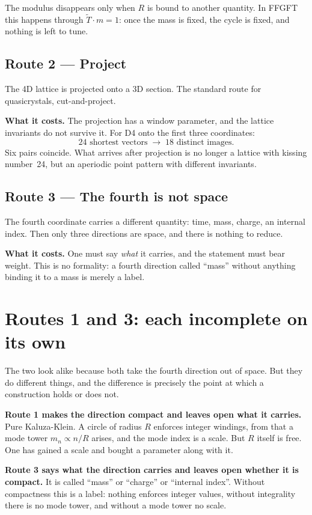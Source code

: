 The modulus disappears only when $R$ is bound to another quantity. In
FFGFT this happens through $\tilde T \cdot m = 1$: once the mass is
fixed, the cycle is fixed, and nothing is left to tune.

\section{Route 2 --- Project}

The 4D lattice is projected onto a 3D section. The standard route for
quasicrystals, cut-and-project.

\textbf{What it costs.} The projection has a window parameter, and the
lattice invariants do not survive it. For D4 onto the first three
coordinates:
\[
  24 \text{ shortest vectors} \;\longrightarrow\; 18 \text{ distinct images.}
\]
Six pairs coincide. What arrives after projection is no longer a
lattice with kissing number~24, but an aperiodic point pattern with
different invariants.

\section{Route 3 --- The fourth is not space}

The fourth coordinate carries a different quantity: time, mass, charge,
an internal index. Then only three directions are space, and there is
nothing to reduce.

\textbf{What it costs.} One must say \emph{what} it carries, and the
statement must bear weight. This is no formality: a fourth direction
called \enquote{mass} without anything binding it to a mass is merely a
label.

\chapter{Routes 1 and 3: each incomplete on its own}

The two look alike because both take the fourth direction out of space.
But they do different things, and the difference is precisely the point
at which a construction holds or does not.

\textbf{Route 1 makes the direction compact and leaves open what it
carries.} Pure Kaluza-Klein. A circle of radius $R$ enforces integer
windings, from that a mode tower $m_n \propto n/R$ arises, and the mode
index is a scale. But $R$ itself is free. One has gained a scale and
bought a parameter along with it.

\textbf{Route 3 says what the direction carries and leaves open whether
it is compact.} It is called \enquote{mass} or \enquote{charge} or
\enquote{internal index}. Without compactness this is a label: nothing
enforces integer values, without integrality there is no mode tower,
and without a mode tower no scale.

